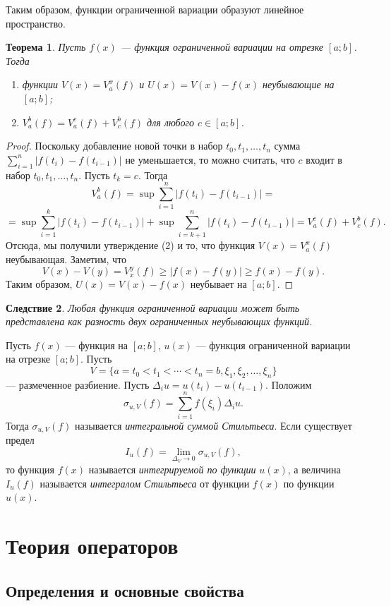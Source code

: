 \documentclass[12pt, titlepage, oneside]{amsbook}
\newtheorem{theorem}{Теорема}[chapter]
\newtheorem{corollary}[theorem]{Следствие}
\theoremstyle{definition}
\theoremstyle{remark}
\begin{document}
Таким образом, функции ограниченной вариации образуют линейное пространство.

\begin{theorem}
\label{Var3}
Пусть $f(x)$ --- функция ограниченной вариации на отрезке $[a;b]$. Тогда
\begin{enumerate}
\item функции $V(x)=V_a^x(f)$ и $U(x)=V(x)-f(x)$ неубывающие на $[a;b]$;
\item $V_a^b(f)=V_a^c(f)+V_c^b(f)$ для любого $c\in[a;b]$.
\end{enumerate}
\end{theorem}

\begin{proof}
Поскольку добавление новой точки в набор $t_0,t_1,\ldots, t_n$ сумма $\sum\limits_{i=1}^n|f(t_i)-f(t_{i-1})|$ не уменьшается, то можно считать, что $c$ входит в набор $t_0,t_1,\ldots, t_n$. Пусть $t_k=c$. Тогда $$V_a^b(f)=\sup\sum\limits_{i=1}^n|f(t_i)-f(t_{i-1})|=$$ $$=\sup\sum\limits_{i=1}^k|f(t_i)-f(t_{i-1})|+\sup\sum\limits_{i=k+1}^n|f(t_i)-f(t_{i-1})|=V_a^c(f)+V_c^b(f).$$ Отсюда, мы получили утверждение (2) и то, что функция $V(x)=V_a^x(f)$ неубывающая. Заметим, что $$V(x)-V(y)=V_x^y(f)\geq |f(x)-f(y)|\geq f(x)-f(y).$$ Таким образом, $U(x)=V(x)-f(x)$ неубывает на $[a;b]$.
\end{proof}

\begin{corollary}
\label{Var4}
Любая функция ограниченной вариации может быть представлена как разность двух ограниченных неубывающих функций.
\end{corollary}

Пусть $f(x)$ --- функция на $[a;b]$, $u(x)$ --- функция ограниченной вариации на отрезке $[a;b]$. Пусть $$V=\{a=t_0<t_1<\cdots<t_n=b,\xi_1,\xi_2,\ldots,\xi_n\}$$ --- размеченное разбиение. Пусть $\Delta_i u=u(t_i)-u(t_{i-1})$. Положим $$\sigma_{u,V}(f)=\sum\limits_{i=1}^n f(\xi_i)\Delta_i u.$$ Тогда $\sigma_{u,V}(f)$ называется \emph{интегральной суммой Стильтьеса}. Если существует предел $$I_u(f)=\lim\limits_{\Delta_V\rightarrow 0} \sigma_{u,V}(f),$$ то функция $f(x)$ называется \emph{интегрируемой по функции} $u(x)$, а величина $I_u(f)$ называется \emph{интегралом Стильтьеса} от функции $f(x)$ по функции $u(x)$.

\chapter{Теория операторов}

\section{Определения и основные свойства}
\end{document}
